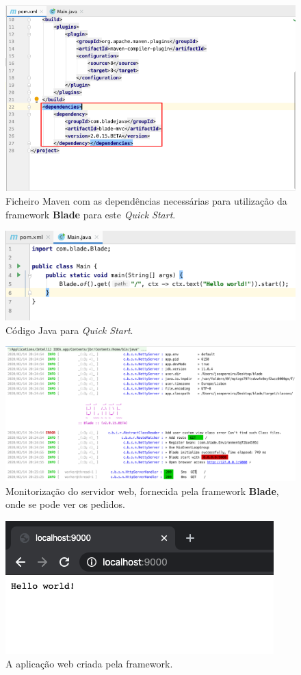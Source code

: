 \begin{figure}[H]
    \centering
    \includegraphics[scale=0.5]{images/blade-1.png}
    \caption{Ficheiro Maven com as dependências necessárias para utilização da framework \textbf{Blade} para este \textit{Quick Start}.}
    \label{fig:blade-1}
\end{figure}

\begin{figure}[H]
    \centering
    \includegraphics[scale=0.6]{images/blade-2.png}
    \caption{Código Java para \textit{Quick Start}.}
    \label{fig:blade-2}
\end{figure}

\begin{figure}[H]
    \centering
    \includegraphics[scale=0.4]{images/blade-3.png}
    \caption{Monitorização do servidor web, fornecida pela framework \textbf{Blade}, onde se pode ver os pedidos.}
    \label{fig:blade-3}
\end{figure}

\begin{figure}[H]
    \centering
    \includegraphics[scale=0.6]{images/blade-4.png}
    \caption{A aplicação web criada pela framework.}
    \label{fig:blade-4}
\end{figure}